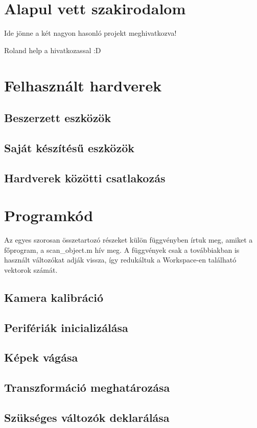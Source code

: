 \documentclass[12pt,a4paper]{article}
\begin{document}
\section{Alapul vett szakirodalom}
Ide jönne a két nagyon hasonló projekt meghivatkozva!



Roland help a hivatkozassal :D
\section{Felhasznált hardverek}
\subsection{Beszerzett eszközök}
\subsection{Saját készítésű eszközök}
\subsection{Hardverek közötti csatlakozás}
\section{Programkód}
Az egyes szorosan összetartozó részeket külön függvényben írtuk meg, amiket a főprogram, a scan\_object.m hív meg. A függvények csak a továbbiakban is használt változókat adják vissza, így redukáltuk a Workspace-en található vektorok számát.
\subsection{Kamera kalibráció}
\subsection{Perifériák inicializálása}
\subsection{Képek vágása}
\subsection{Transzformáció meghatározása}
\subsection{Szükséges változók deklarálása}
\end{document}
